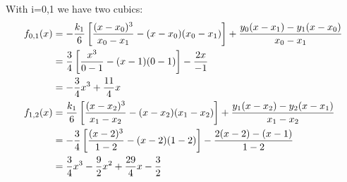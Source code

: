\begin{exercise}{4}
With i=0,1 we have two cubics:
\begin{align}
\notag
f_{0,1}(x) &= - \frac{k_1}{6}\left[\frac{(x-x_0)^3}{x_0-x_1}-(x-x_0)(x_0-x_1)\right]
+ \frac{y_0(x-x_1)-y_1(x-x_0)}{x_0-x_1}\\
\notag
&=\frac{3}{4}\left[\frac{x^3}{0-1} - (x-1)(0-1)\right] - \frac{2x}{-1}\\
\notag
&= -\frac{3}{4}x^3 + \frac{11}{4}x\\ 
\notag
f_{1,2}(x) &=\frac{k_1}{6}\left[\frac{(x-x_2)^3}{x_1-x_2}-(x-x_2)(x_1-x_2)\right]
+\frac{y_1(x-x_2)-y_2(x-x_1)}{x_1-x_2}\\
\notag
&=-\frac{3}{4}\left[\frac{(x-2)^3}{1-2} - (x-2)(1-2)\right] - \frac{2(x-2)-(x-1)}{1-2}\\
\notag
&=\frac{3}{4}x^3-\frac{9}{2}x^2+\frac{29}{4}x-\frac{3}{2}
\end{align}
\end{exercise}


 

